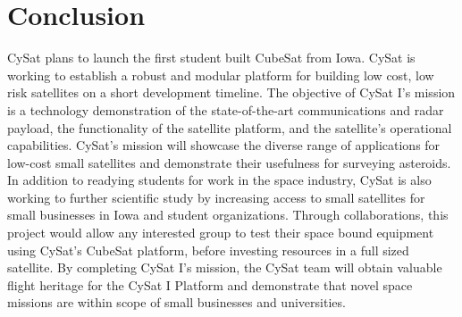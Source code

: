 \documentclass[nocover]            %
{CSLI}                       %
\begin{document}
\newpage
\section{Conclusion}
CySat plans to launch the first student built CubeSat from Iowa. CySat is working to establish a robust and modular platform for building low cost, low risk satellites on a short development timeline. The objective of CySat I's mission is a technology demonstration of the state-of-the-art communications and radar payload, the functionality of the satellite platform, and the satellite's operational capabilities. CySat's mission will showcase the diverse range of applications for low-cost small satellites and demonstrate their usefulness for surveying asteroids. In addition to readying students for work in the space industry, CySat is also working to further scientific study by increasing access to small satellites for small businesses in Iowa and student organizations. Through collaborations, this project would allow any interested group to test their space bound equipment using CySat's CubeSat platform, before investing resources in a full sized satellite. By completing CySat I's mission, the CySat team will obtain valuable flight heritage for the CySat I Platform and demonstrate that novel space missions are within scope of small businesses and universities.
\newpage
\end{document}
